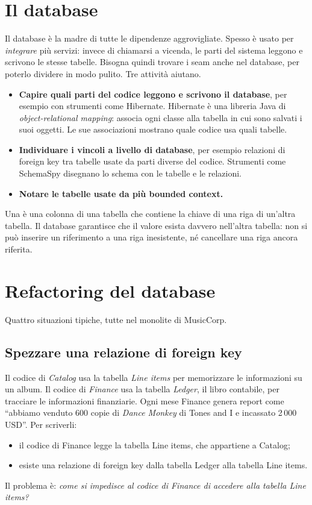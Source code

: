 \section{Il database}
\label{sec:split-database}

Il database è la madre di tutte le dipendenze aggrovigliate. Spesso è usato per \emph{integrare} più servizi: invece
di chiamarsi a vicenda, le parti del sistema leggono e scrivono le stesse tabelle. Bisogna quindi trovare i seam
anche nel database, per poterlo dividere in modo pulito. Tre attività aiutano.
\begin{itemize}
  \item \textbf{Capire quali parti del codice leggono e scrivono il database}, per esempio con strumenti come
    Hibernate. Hibernate è una libreria Java di \emph{object-relational mapping}: associa ogni classe alla tabella in
    cui sono salvati i suoi oggetti. Le sue associazioni mostrano quale codice usa quali tabelle.
  \item \textbf{Individuare i vincoli a livello di database}, per esempio relazioni di foreign key tra tabelle usate
    da parti diverse del codice. Strumenti come SchemaSpy disegnano lo schema con le tabelle e le relazioni.
  \item \textbf{Notare le tabelle usate da più bounded context.}
\end{itemize}

Una  è una colonna di una tabella che contiene la chiave di una riga di un'altra tabella. Il
database garantisce che il valore esista davvero nell'altra tabella: non si può inserire un riferimento a una riga
inesistente, né cancellare una riga ancora riferita.

\section{Refactoring del database}
\label{sec:split-refactoring}

Quattro situazioni tipiche, tutte nel monolite di MusicCorp.

\subsection{Spezzare una relazione di foreign key}
\label{sec:split-fk}

Il codice di \emph{Catalog} usa la tabella \emph{Line items} per memorizzare le informazioni su un album. Il codice di
\emph{Finance} usa la tabella \emph{Ledger}, il libro contabile, per tracciare le informazioni finanziarie. Ogni mese
Finance genera report come ``abbiamo venduto 600 copie di \emph{Dance Monkey} di Tones and I e incassato 2\,000
USD''. Per scriverli:
\begin{itemize}
  \item il codice di Finance legge la tabella Line items, che appartiene a Catalog;
  \item esiste una relazione di foreign key dalla tabella Ledger alla tabella Line items.
\end{itemize}
Il problema è: \emph{come si impedisce al codice di Finance di accedere alla tabella Line items?}


